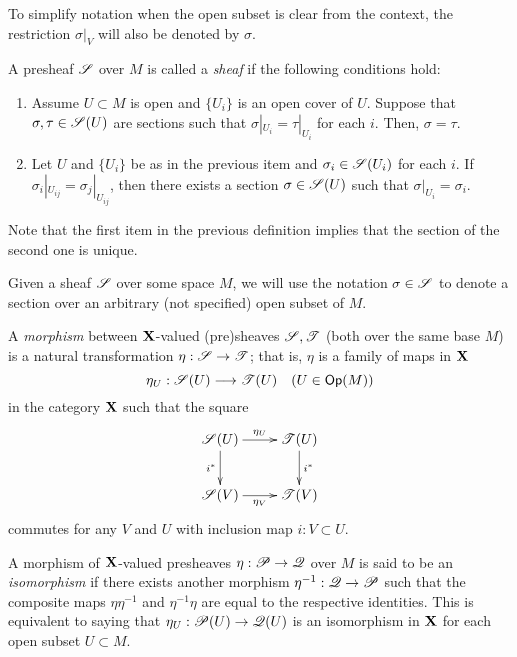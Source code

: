 \begin{notation}
To simplify notation when the open subset is clear from the context, the restriction $\sigma|_V$ will also be denoted by $\sigma$.
\end{notation}

\begin{defi}\label{def_sheaf}
A presheaf $\mathscr{S}$ over $M$ is called a \emph{sheaf} if the following conditions hold:
\begin{enumerate}
\item Assume $U\subset M$ is open and $\{U_i\}$ is an open cover of $U$. Suppose that $\sigma ,\tau \in \mathscr{S}(U)$ are sections such that $\sigma |_{U_i}=\tau |_{U_i}$ for each $i$. Then, $\sigma =\tau$.
\item Let $U$ and $\{U_i\}$ be as in the previous item and $\sigma_i \in \mathscr{S}(U_i)$ for each $i$. If $\sigma_i|_{U_{ij}}=\sigma_j|_{U_{ij}}$, then there exists a section $\sigma \in \mathscr{S}(U)$ such that $\sigma |_{U_i}=\sigma_i$.
\end{enumerate}
\end{defi}

Note that the first item in the previous definition implies that the section of the second one is unique.

\begin{notation}
Given a sheaf $\mathscr{S}$ over some space $M$, we will use the notation $\sigma \in \mathscr{S}$ to denote a section over an arbitrary (not specified) open subset of $M$.
\end{notation}

A \emph{morphism} between ${\bf X}$-valued (pre)sheaves $\mathscr{S},\mathscr{T}$ (both over the same base $M$) is a natural transformation $\eta :\mathscr{S}\to \mathscr{T}$; that is, $\eta$ is a family of maps in ${\bf X}$
$$\eta_U:\mathscr{S}(U)\longrightarrow \mathscr{T}(U) \quad (U\in \mathsf{Op}(M))$$
in the category ${\bf X}$ such that the square
\begin{equation}\label{nat_transf_sheaf}
\xymatrix{
\scr{S}(U) \ar[r]^{\eta_U} \ar[d]_{i^*} & \scr{T}(U) \ar[d]^{i^*} \\
\scr{S}(V) \ar[r]_{\eta_V} & \scr{T}(V) }
\end{equation}
commutes for any $V$ and $U$ with inclusion map $i:V\subset U$.

A morphism of ${\bf X}$-valued presheaves $\eta :\mathscr{P}\to \mathscr{Q}$ over $M$ is said to be an \emph{isomorphism} if there exists another morphism $\eta^{-1}:\mathscr{Q}\to \mathscr{P}$ such that the composite maps $\eta \eta^{-1}$ and $\eta^{-1}\eta$ are equal to the respective identities. This is equivalent to saying that $\eta_U:\mathscr{P}(U)\to \mathscr{Q}(U)$ is an isomorphism in ${\bf X}$ for each open subset $U\subset M$.


